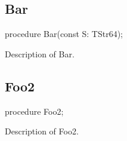 \documentclass{report}
\begin{document}
\subsection*{Bar}
\begin{list}{}{
\setlength{\itemindent}{0cm}
\setlength{\listparindent}{0cm}
\setlength{\leftmargin}{\evensidemargin}
\addtolength{\leftmargin}{\tmplength}
\settowidth{\labelsep}{X}
\addtolength{\leftmargin}{\labelsep}
\setlength{\labelwidth}{\tmplength}
}
\begin{flushleft}
\item[\textbf{Declaration}\hfill]
\begin{ttfamily}
procedure Bar(const S: TStr64);\end{ttfamily}


\end{flushleft}
\par
\item[\textbf{Description}]
Description of Bar.

\end{list}
\subsection*{Foo2}
\begin{list}{}{
\setlength{\itemindent}{0cm}
\setlength{\listparindent}{0cm}
\setlength{\leftmargin}{\evensidemargin}
\addtolength{\leftmargin}{\tmplength}
\settowidth{\labelsep}{X}
\addtolength{\leftmargin}{\labelsep}
\setlength{\labelwidth}{\tmplength}
}
\begin{flushleft}
\item[\textbf{Declaration}\hfill]
\begin{ttfamily}
procedure Foo2;\end{ttfamily}


\end{flushleft}
\par
\item[\textbf{Description}]
Description of Foo2.

\end{list}
\end{document}
